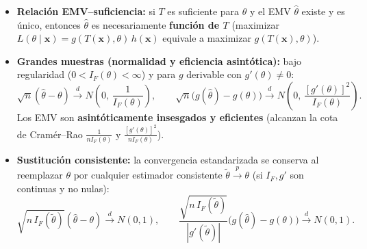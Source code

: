 \documentclass[10pt,a4paper]{article}
\newcommand{\dto}{\xrightarrow{\;d\;}}
\newcommand{\pto}{\xrightarrow{\;p\;}}
\begin{document}
\begin{thmbox}[frametitle={EMV, suficiencia y comportamiento en grandes muestras}]
\begin{itemize}
  \item \textbf{Relación EMV--suficiencia:} si $T$ es suficiente para $\theta$ y el EMV $\hat\theta$ existe y es único, entonces $\hat\theta$ es necesariamente \textbf{función de $T$} (maximizar $L(\theta \mid \mathbf{x}) = g(T(\mathbf{x}),\theta)\,h(\mathbf{x})$ equivale a maximizar $g(T(\mathbf{x}),\theta)$).
  \item \textbf{Grandes muestras (normalidad y eficiencia asintótica):} bajo regularidad ($0 < I_F(\theta) < \infty$) y para $g$ derivable con $g'(\theta) \ne 0$:
  \[
  \sqrt{n}(\hat\theta - \theta) \dto N\!\left(0,\, \frac{1}{I_F(\theta)}\right), \qquad \sqrt{n}\big(g(\hat\theta) - g(\theta)\big) \dto N\!\left(0,\, \frac{[g'(\theta)]^2}{I_F(\theta)}\right).
  \]
  Los EMV son \textbf{asintóticamente insesgados y eficientes} (alcanzan la cota de Cramér--Rao $\frac{1}{nI_F(\theta)}$ y $\frac{[g'(\theta)]^2}{nI_F(\theta)}$).
  \item \textbf{Sustitución consistente:} la convergencia estandarizada se conserva al reemplazar $\theta$ por cualquier estimador consistente $\tilde\theta \pto \theta$ (si $I_F, g'$ son continuas y no nulas):
  \[
  \sqrt{n\,I_F(\tilde\theta)}(\hat\theta - \theta) \dto N(0, 1), \qquad \frac{\sqrt{n\,I_F(\tilde\theta)}}{|g'(\tilde\theta)|}\big(g(\hat\theta) - g(\theta)\big) \dto N(0, 1).
  \]
\end{itemize}
\end{thmbox}
\end{document}
